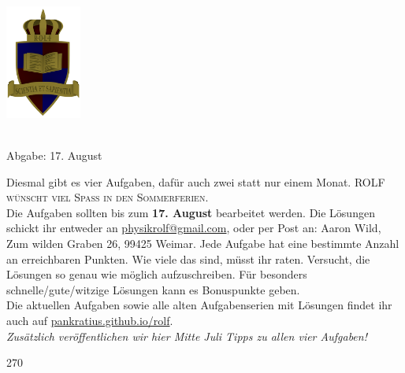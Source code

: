\documentclass[a4paper]{article}
\begin{document}
	\vspace*{-2cm}
	\parbox{4cm}{\includegraphics[width=2.5cm]{../images/ROLF4.png}}
	\parbox{10.6cm}{ \\ Abgabe: 17. August \\ \vspace*{-.5cm} }
	
	

\pagestyle{empty}
\begin{framed}
	\noindent
	\scriptsize
	Diesmal gibt es vier Aufgaben, dafür auch zwei statt nur einem Monat. \textsc{ROLF wünscht viel Spaß in den Sommerferien.}\\
	Die Aufgaben sollten bis zum \textbf{17. August} bearbeitet werden. Die Lösungen schickt ihr entweder an \href{mailto:physikrolf@gmail.com}{physikrolf@gmail.com}, oder per Post an: Aaron Wild, Zum wilden Graben 26, 99425 Weimar.
	Jede Aufgabe hat eine bestimmte Anzahl an erreichbaren Punkten. Wie viele das sind, müsst ihr raten. Versucht, die Lösungen so genau wie möglich aufzuschreiben. Für besonders schnelle/gute/witzige Lösungen kann es Bonuspunkte geben.\\ Die aktuellen Aufgaben sowie alle alten Aufgabenserien mit Lösungen findet ihr auch auf \url{pankratius.github.io/rolf}.\\ \textit{Zusätzlich veröffentlichen wir hier Mitte Juli Tipps zu allen vier Aufgaben!}
\end{framed}

\noindent




\vspace{2cm}



%





\newpage
	\hspace{4cm}
	\vspace{-1cm}
\begin{turn}{270}


\end{turn}
\end{document}
